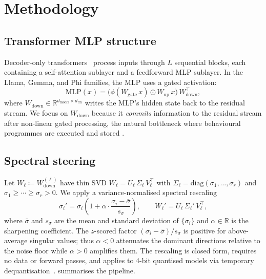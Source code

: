 \documentclass{article}
\begin{document}
\section{Methodology}
\label{sec:method}

\subsection{Transformer MLP structure}
\label{sec:background}

Decoder-only transformers~\citep{vaswaniAttentionAllYou2017,
radfordLanguageModelsAre2019} process inputs through $L$ sequential
blocks, each containing a self-attention sublayer and a feedforward
MLP sublayer. In the Llama, Gemma, and Phi families, the MLP uses a
gated activation:
\[
 \mathrm{MLP}(x) = \bigl(\phi(W_\mathrm{gate}\,x) \odot W_\mathrm{up}\,x\bigr)
 \,W_\mathrm{down}^\top,
\]
where $W_\mathrm{down} \in \mathbb{R}^{d_\mathrm{model} \times d_\mathrm{ffn}}$
writes the MLP's hidden state back to the residual stream.
We focus on $W_\mathrm{down}$ because it \emph{commits} information to
the residual stream after non-linear gated processing, the natural
bottleneck where behavioural programmes are executed and stored
\citep{mengLocatingEditingFactual2022,nandaProgressMeasures2023}.

\subsection{Spectral steering}
\label{sec:steering}

Let $W_\ell \coloneqq W_\mathrm{down}^{(\ell)}$ have thin SVD
$W_\ell = U_\ell\,\Sigma_\ell\,V_\ell^\top$ with
$\Sigma_\ell = \mathrm{diag}(\sigma_1,\ldots,\sigma_r)$ and
$\sigma_1 \ge \cdots \ge \sigma_r > 0$. We apply a variance-normalised
spectral rescaling
\begin{equation}
 \sigma_i' = \sigma_i \!\left(1 + \alpha \cdot
 \frac{\sigma_i - \bar\sigma}{s_\sigma}\right),
 \qquad W_\ell' = U_\ell\,\Sigma_\ell'\,V_\ell^\top,
 \label{eq:steering}
\end{equation}
where $\bar\sigma$ and $s_\sigma$ are the mean and standard deviation
of $\{\sigma_i\}$ and $\alpha \in \mathbb{R}$ is the sharpening
coefficient. The $z$-scored factor $(\sigma_i - \bar\sigma)/s_\sigma$
is positive for above-average singular values; thus $\alpha < 0$
attenuates the dominant directions relative to the noise floor while
$\alpha > 0$ amplifies them. The rescaling is closed form, requires no
data or forward passes, and applies to 4-bit quantised models via
temporary dequantisation~\citep{dettmersGPTQAccuratePostTraining2022}.
 summarises the pipeline.
\end{document}
